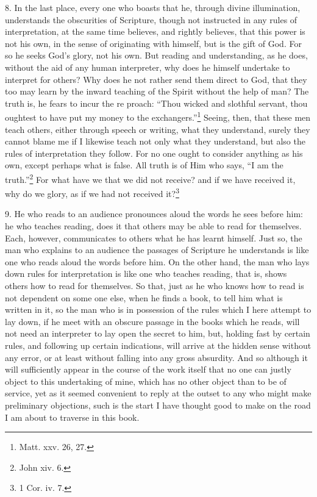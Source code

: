 8. In the last place, every one who boasts that he, through divine illumination, understands the obscurities of Scripture, though not instructed in any rules of interpretation, at the same time believes, and rightly believes, that this power is not his own, in the sense of originating with himself, but is the gift of God. For so he seeks God’s glory, not his own. But reading and understanding, as he does, without the aid of any human interpreter, why does he himself undertake to interpret for others? Why does he not rather send them direct to God, that they too may learn by the inward teaching of the Spirit without the help of man? The truth is, he fears to incur the re  proach: “Thou wicked and slothful servant, thou oughtest to have put my money to the exchangers.”\footnote{Matt. xxv. 26, 27.} Seeing, then, that these men teach others, either through speech or writing, what they understand, surely they cannot blame me if I likewise teach not only what they understand, but also the rules of interpretation they follow. For no one ought to consider anything as his own, except perhaps what is false. All truth is of Him who says, “I am the truth.”\footnote{John xiv. 6.} For what have we that we did not receive? and if we have received it, why do we glory, as if we had not received it?\footnote{1 Cor. iv. 7.}

9. He who reads to an audience pronounces aloud the words he sees before him: he who teaches reading, does it that others may be able to read for themselves. Each, however, communicates to others what he has learnt himself. Just so, the man who explains to an audience the passages of Scripture he understands is like one who reads aloud the words before him. On the other hand, the man who lays down rules for interpretation is like one who teaches reading, that is, shows others how to read for themselves. So that, just as he who knows how to read is not dependent on some one else, when he finds a book, to tell him what is written in it, so the man who is in possession of the rules which I here attempt to lay down, if he meet with an obscure passage in the books which he reads, will not need an interpreter to lay open the secret to him, but, holding fast by certain rules, and following up certain indications, will arrive at the hidden sense without any error, or at least without falling into any gross absurdity. And so although it will sufficiently appear in the course of the work itself that no one can justly object to this undertaking of mine, which has no other object than to be of service, yet as it seemed convenient to reply at the outset to any who might make preliminary objections, such is the start I have thought good to make on the road I am about to traverse in this book.

